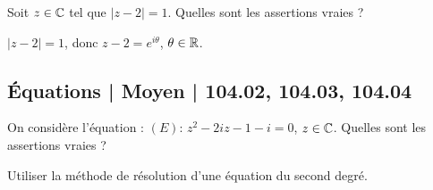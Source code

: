 \begin{question}
 
Soit $z\in \mathbb{C}$ tel que $|z-2|=1$.  Quelles sont les assertions vraies ?
\begin{answers}


\end{answers}
\begin{explanations}
$|z-2|=1$, donc $z-2=e^{i\theta}$, $\theta \in \mathbb{R}$.

\end{explanations}

\end{question}




\subsection{Équations | Moyen | 104.02, 104.03, 104.04}




\begin{question}
 
On considère l'équation : $(E) : \, z^2-2iz-1-i=0$, $z\in \mathbb{C}$.   Quelles sont les assertions vraies ?
\begin{answers}
    

    
\end{answers}
\begin{explanations}
Utiliser la méthode de résolution d'une équation du second degré.
\end{explanations}

\end{question}



